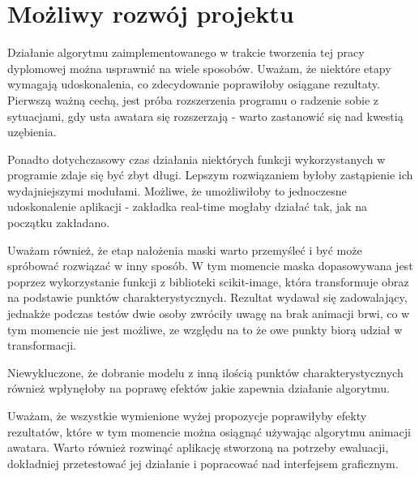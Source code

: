 \section{Możliwy rozwój projektu}
Działanie algorytmu zaimplementowanego w trakcie tworzenia tej pracy dyplomowej można usprawnić na wiele sposobów. Uważam, że niektóre etapy wymagają udoskonalenia, co zdecydowanie poprawiłoby osiągane rezultaty. Pierwszą ważną cechą, jest próba rozszerzenia programu o radzenie sobie z sytuacjami, gdy usta awatara się rozszerzają - warto zastanowić się nad kwestią uzębienia. 

Ponadto dotychczasowy czas działania niektórych funkcji wykorzystanych w programie zdaje się być zbyt długi. Lepszym rozwiązaniem byłoby zastąpienie ich wydajniejszymi modułami. Możliwe, że umożliwiłoby to jednoczesne udoskonalenie aplikacji - zakładka real-time mogłaby działać tak, jak na początku zakładano.

Uważam również, że etap nałożenia maski warto przemyśleć i być może spróbować rozwiązać w inny sposób. W tym momencie maska dopasowywana jest poprzez wykorzystanie funkcji z biblioteki scikit-image, która transformuje obraz na podstawie punktów charakterystycznych. Rezultat wydawał się zadowalający, jednakże podczas testów dwie osoby zwróciły uwagę na brak animacji brwi, co w tym momencie nie jest możliwe, ze względu na to że owe punkty biorą udział w transformacji. 

Niewykluczone, że dobranie modelu z inną ilością punktów charakterystycznych również wpłynęłoby na poprawę efektów jakie zapewnia działanie algorytmu.

Uważam, że wszystkie wymienione wyżej propozycje poprawiłyby efekty rezultatów, które w tym momencie można osiągnąć używając algorytmu animacji awatara. Warto również rozwinąć aplikację stworzoną na potrzeby ewaluacji, dokładniej przetestować jej działanie i popracować nad interfejsem graficznym.